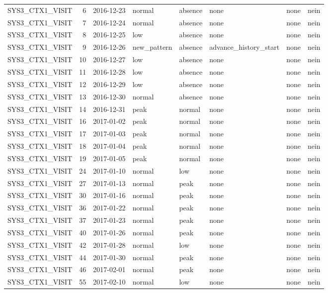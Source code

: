 \begin{tabular}{lrllllll}
SYS3\_CTX1\_VISIT & 6 & 2016-12-23 & normal & absence & none & none & nein \\
SYS3\_CTX1\_VISIT & 7 & 2016-12-24 & normal & absence & none & none & nein \\
SYS3\_CTX1\_VISIT & 8 & 2016-12-25 & low & absence & none & none & nein \\
SYS3\_CTX1\_VISIT & 9 & 2016-12-26 & new\_pattern & absence & advance\_history\_start & none & nein \\
SYS3\_CTX1\_VISIT & 10 & 2016-12-27 & low & absence & none & none & nein \\
SYS3\_CTX1\_VISIT & 11 & 2016-12-28 & low & absence & none & none & nein \\
SYS3\_CTX1\_VISIT & 12 & 2016-12-29 & low & absence & none & none & nein \\
SYS3\_CTX1\_VISIT & 13 & 2016-12-30 & normal & absence & none & none & nein \\
SYS3\_CTX1\_VISIT & 14 & 2016-12-31 & peak & normal & none & none & nein \\
SYS3\_CTX1\_VISIT & 16 & 2017-01-02 & peak & normal & none & none & nein \\
SYS3\_CTX1\_VISIT & 17 & 2017-01-03 & peak & normal & none & none & nein \\
SYS3\_CTX1\_VISIT & 18 & 2017-01-04 & peak & normal & none & none & nein \\
SYS3\_CTX1\_VISIT & 19 & 2017-01-05 & peak & normal & none & none & nein \\
SYS3\_CTX1\_VISIT & 24 & 2017-01-10 & normal & low & none & none & nein \\
SYS3\_CTX1\_VISIT & 27 & 2017-01-13 & normal & peak & none & none & nein \\
SYS3\_CTX1\_VISIT & 30 & 2017-01-16 & normal & peak & none & none & nein \\
SYS3\_CTX1\_VISIT & 36 & 2017-01-22 & normal & peak & none & none & nein \\
SYS3\_CTX1\_VISIT & 37 & 2017-01-23 & normal & peak & none & none & nein \\
SYS3\_CTX1\_VISIT & 40 & 2017-01-26 & normal & peak & none & none & nein \\
SYS3\_CTX1\_VISIT & 42 & 2017-01-28 & normal & low & none & none & nein \\
SYS3\_CTX1\_VISIT & 44 & 2017-01-30 & normal & peak & none & none & nein \\
SYS3\_CTX1\_VISIT & 46 & 2017-02-01 & normal & peak & none & none & nein \\
SYS3\_CTX1\_VISIT & 55 & 2017-02-10 & normal & low & none & none & nein \\

\end{tabular}

